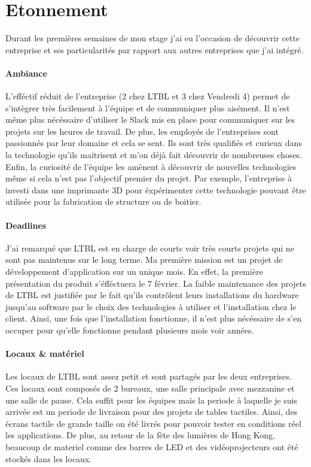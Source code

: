 \documentclass{article}
\begin{document}
\section{Etonnement}

Durant les premières semaines de mon stage j'ai eu l'occasion de découvrir cette entreprise et ses particularités par rapport aux autres entreprises que j'ai intégré.

\paragraph{Ambiance} L'efféctif réduit de l'entreprise (2 chez LTBL et 3 chez Vendredi 4) permet de s'intègrer très facilement à l'équipe et de communiquer plus aisément.
Il n'est même plus nécéssaire d'utiliser le Slack mis en place pour communiquer sur les projets sur les heures de travail.
De plus, les employés de l'entreprises sont passionnés par leur domaine et cela se sent.
Ils sont très qualifiés et curieux dans la technologie qu'ils maitrisent et m'on déjà fait découvrir de nombreuses choses.
Enfin, la curiosité de l'équipe les amènent à découvrir de nouvelles technologies même si cela n'est pas l'objectif premier du projet.
Par exemple, l'entreprise à investi dans une imprimante 3D pour éxpérimenter cette technologie pouvant être utilisée pour la fabrication de structure ou de boitier.

\paragraph{Deadlines} J'ai remarqué que LTBL est en charge de courts voir très courts projets qui ne sont pas maintenus sur le long terme.
Ma première mission est un projet de développement d'application sur un unique mois.
En effet, la première présentation du produit s'éfféctuera le 7 février.
La faible maintenance des projets de LTBL est justifiée par le fait qu'ils contrôlent leurs installations du hardware jusqu'au software par le choix des technologies à utiliser et l'installation chez le client.
Ainsi, une fois que l'installation fonctionne, il n'est plus nécéssaire de s'en occuper pour qu'elle fonctionne pendant plusieurs mois voir années.

\paragraph{Locaux \& matériel} Les locaux de LTBL sont assez petit et sont partagés par les deux entreprises.
Ces locaux sont composés de 2 bureaux, une salle principale avec mezzanine et une salle de pause.
Cela suffit pour les équipes mais la periode à laquelle je suis arrivée est un periode de livraison pour des projets de tables tactiles.
Ainsi, des écrans tactile de grande taille on été livrés pour pouvoir tester en conditions réel les applications.
De plus, au retour de la fète des lumières de Hong Kong, beaucoup de materiel comme des barres de LED et des vidéoprojecteurs ont été stockés dans les locaux.
\end{document}
